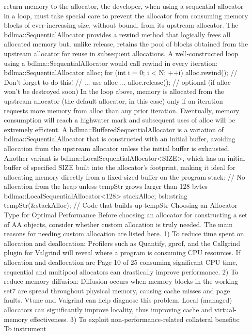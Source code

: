 return memory to the allocator, the developer, when using a sequential
allocator in a loop, must take special care to prevent the allocator from
consuming memory blocks of ever-increasing size, without bound, from its
upstream allocator. The bdlma::SequentialAllocator provides a rewind
method that logically frees all allocated memory but, unlike release, retains
the pool of blocks obtained from the upstream allocator for reuse in
subsequent allocations. A well-constructed loop using a
bdlma::SequentialAllocator would call rewind in every iteration:
bdlma::SequentialAllocator alloc;
for (int i = 0; i < N; ++i) {
 alloc.rewind(); // Don't forget to do this!
 // ... use alloc ...
}
alloc.release(); // optional (if alloc won't be destroyed soon)
In the loop above, memory is allocated from the upstream allocator (the default
allocator, in this case) only if an iteration requests more memory from alloc
than any prior iteration. Eventually, memory consumption will reach a highwater mark and subsequent uses of alloc will be extremely efficient.
A bdlma::BufferedSequentialAllocator is a variation of
bdlma::SequentialAllocator that is constructed with an initial buffer, avoiding
allocation from the upstream allocator unless the initial buffer is exhausted.
Another variant is bdlma::LocalSequentialAllocator<SIZE>, which has an
initial buffer of specified SIZE built into the allocator’s footprint, making it ideal
for allocating memory directly from a fixed-sized buffer on the program stack:
// No allocation from the heap unless tempStr grows larger than 128 bytes
bdlma::LocalSequentialAllocator<128> stackAlloc;
bsl::string tempStr(&stackAlloc);
// Code that builds up tempStr
Choosing an Allocator Type for Optimal Performance
Before choosing an allocator for constructing a set of AA objects, consider
whether custom allocation is truly needed. The main reasons for needing
custom allocation are listed here.
1) To reduce time spent on allocation and deallocation: Profilers such
as Quantify, gprof, and the Callgrind plugin for Valgrind will reveal where
a program is consuming CPU resources. If allocation and deallocation are 
Page 10 of 25
consuming significant CPU time, sequential and multipool allocators can
drastically improve performance.
2) To reduce memory diffusion: Diffusion occurs when memory blocks in
the working set7 are spread throughout physical memory, causing cache
misses and page faults. Vtune and Valgrind can help diagnose this
problem. Local (managed) allocators can significantly improve locality,
thus improving cache and virtual-memory effectiveness.
3) To exploit non-performance-related collateral benefits: To instrument
